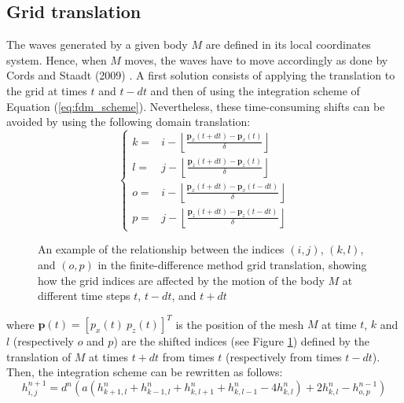 \documentclass[11pt]{article}
\begin{document}
\subsection{Grid translation}
\label{subsec:gridTranslation}
The waves generated by a given body $M$ are defined in its local coordinates system.
Hence, when $M$ moves, the waves have to move accordingly as done by Cords and Staadt (2009) \cite{cordsRealTimeOpenWater2009}.
A first solution consists of applying the translation to the grid at times $t$ and $t-dt$ and then of using the integration scheme of Equation (\ref{eq:fdm_scheme}).
Nevertheless, these time-consuming shifts can be avoided by using the following domain translation:
\begin{equation}
	\begin{cases}
		k = & i - \left\lfloor\frac{\mathbf{p}_x(t+dt)-\mathbf{p}_x(t)}{\delta}\right\rfloor    \\
		l = & j - \left\lfloor\frac{\mathbf{p}_z(t+dt)-\mathbf{p}_z(t)}{\delta}\right\rfloor    \\
		o = & i - \left\lfloor\frac{\mathbf{p}_x(t+dt)-\mathbf{p}_x(t-dt)}{\delta}\right\rfloor \\
		p = & j - \left\lfloor\frac{\mathbf{p}_z(t+dt)-\mathbf{p}_z(t-dt)}{\delta}\right\rfloor
	\end{cases}
\end{equation}


\begin{figure}[!h]
	\centering
	
	\caption{An example of the relationship between the indices $(i,j)$, $(k,l)$, and $(o,p)$ in the finite-difference method grid translation, showing how the grid indices are affected by the motion of the body $M$ at different time steps $t$, $t-dt$, and $t+dt$}
	\label{fig:mdfIndices}
\end{figure}


where $\mathbf p(t)=\left[p_x(t)\ p_z(t)\right]^T$ is the position of the mesh $M$ at time $t$, $k$ and $l$ (respectively $o$ and $p$) are the shifted indices (see Figure \ref{fig:mdfIndices}) defined by the translation of $M$ at times $t+dt$ from times $t$ (respectively from times $t-dt$).
Then, the integration scheme can be rewritten as follows:
\begin{equation}
	\label{eq:fdm_scheme_corrected}
	h_{i,j}^{n+1} = d^n\left(a\left(h_{k+1,l}^n+h_{k-1,l}^n+h_{k,l+1}^n+h_{k,l-1}^n- 4 h_{k,l}^n\right) + 2 h_{k,l}^n - h_{o,p}^{n-1}\right)
\end{equation}
\end{document}
